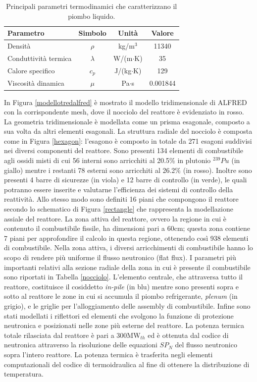 \begin{table}[!htb]
\centering
 \begin{tabular}{lccc}
\toprule
Parametro & Simbolo & Unità & Valore \\
\midrule
Densità & $\rho$ & kg/m$^3$ & 11340 \\
Conduttività termica & $\lambda$ & W/(m$\cdot$K) & 35 \\
Calore specifico & $c_p$ & J/(kg$\cdot$K) & 129 \\
Viscosità dinamica & $\mu$ & Pa$\cdot$s & 0.001844 \\
\bottomrule
\end{tabular}
\caption{Principali parametri termodinamici che caratterizzano il piombo 
liquido.}
\label{leadparam}
\end{table}
In Figura \ref{modellotredalfred} è mostrato il modello tridimensionale di 
ALFRED con la corrispondente mesh, dove il nocciolo del reattore è 
evidenziato in rosso.
La geometria tridimensionale è modellata come un prisma esagonale, composto a 
sua volta da altri elementi esagonali.
La struttura radiale del nocciolo è composta come in Figura \ref{hexagon}:
l'esagono è composto in totale da 271 esagoni suddivisi nei
diversi componenti del reattore.
Sono presenti 134 elementi di combustibile agli ossidi misti di cui 56 interni 
sono arricchiti 
al 20.5$\%$ in plutonio $^{239}Pu$ (in giallo) mentre i restanti 78 esterni sono 
arricchiti
al 26.2$\%$ (in rosso).
Inoltre sono 
presenti 4 barre di sicurezze (in viola) e 12 barre di controllo (in verde), 
le quali potranno essere 
inserite e valutarne l'efficienza dei sistemi di controllo della reattività.
Allo stesso modo sono definiti 16 piani che compongono il reattore secondo lo 
schematico di Figura \ref{rectangle} che rappresenta la modellazione assiale 
del 
reattore.
La zona attiva del reattore, 
ovvero la regione in cui è contenuto il combustibile fissile, ha dimensioni 
pari a 60cm; questa zona contiene 7 piani 
per approfondire il calcolo in questa regione, ottenendo così 938 elementi di 
combustibile.
Nella zona attiva, i diversi arricchimenti di combustibile hanno lo scopo di rendere più 
uniforme il flusso neutronico (flat flux). I parametri più importanti relativi 
alla sezione radiale della zona in cui è presente il combustibile 
sono riportati in Tabella \ref{nocciolo}.
L'elemento centrale, che attraversa tutto il reattore, costituisce il 
cosiddetto 
\textit{in-pile} (in blu) mentre sono presenti
sopra e sotto al reattore le zone in cui si accumula il piombo refrigerante, 
\textit{plenum} (in grigio), e le griglie per l'alloggiamento delle assembly 
di combustibile.
Infine sono stati modellati i riflettori ed elementi che svolgono la funzione 
di 
protezione neutronica e posizionati nelle zone più esterne 
del reattore.
La potenza termica totale rilasciata dal reattore è pari a 300MW$_{th}$ ed è 
ottenuta
dal codice di neutronica attraverso la risoluzione delle equazioni $SP_N$ del 
flusso neutronico sopra l'intero
reattore. La potenza termica è trasferita negli elementi computazionali del 
codice di termoidraulica al
fine di ottenere la distribuzione di temperatura.

